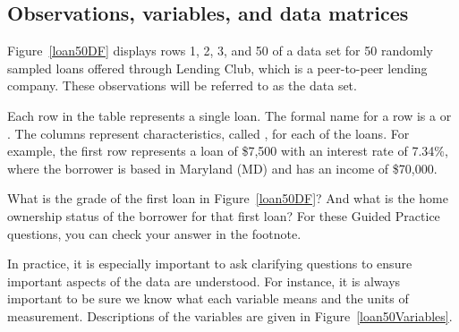 
\subsection{Observations, variables, and data matrices}


Figure~\ref{loan50DF} displays rows 1, 2, 3, and 50 of a data set
for 50 randomly sampled loans offered through Lending Club,
which is a peer-to-peer lending company.
These observations will be referred to as the
 data set.

Each row in the table represents a single loan.
The formal name for a row is a 
or .
The columns represent characteristics,
called ,
for each of the loans.
For example, the first row represents a loan of \$7,500 with an interest rate of 7.34\%, where the borrower is based in Maryland (MD) and has an income of \$70,000.

\begin{exercisewrap}
\begin{nexercise}
What is the grade of the first loan in Figure~\ref{loan50DF}?
And what is the home ownership status of the borrower
for that first loan?
For these Guided Practice questions, you can check your answer
in the footnote.\footnotemark{}
\end{nexercise}
\end{exercisewrap}

In practice, it is especially important to ask clarifying
questions to ensure important aspects of the data are understood.
For instance, it is always important to be sure we know what
each variable means and the units of measurement.
Descriptions of the  variables are given
in Figure~\ref{loan50Variables}.

